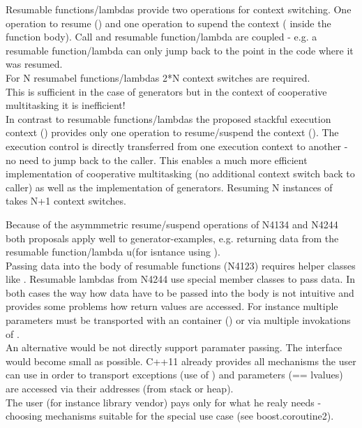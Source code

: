 Resumable functions/lambdas provide two operations for context switching. One
operation to resume (\rlop) and one operation to supend the context (\yield
inside the function body). Call and resumable function/lambda are coupled - e.g.
a resumable function/lambda can only jump back to the point in the code where it
was resumed.\\
For N resumabel functions/lambdas 2*N context switches are required.\\
This is sufficient in the case of generators but in the context of cooperative
multitasking it is inefficient!\\
In contrast to resumable functions/lambdas the proposed stackful execution
context (\ectx) provides only one operation to resume/suspend the context
(\ectxop). The execution control is directly transferred from one
execution context to another - no need to jump back to the caller. This enables
a much more efficient implementation of cooperative multitasking (no additional
context switch back to caller) as well as the implementation of generators.
Resuming N instances of \ectx takes N+1 context switches.

Because of the asymmmetric resume/suspend operations of N4134 and N4244 both
proposals apply well to generator-examples, e.g. returning data from the
resumable function/lambda u(for isntance using \yield).\\
Passing data into the body of resumable functions (N4123) requires helper
classes like \channel.
Resumable lambdas from N4244 use special member classes \rlwanted to pass data.
In both cases the way how data have to be passed into the body is not intuitive
and provides some problems how return values are accessed. For instance multiple
parameters must be transported with an container (\tuple) or via
multiple invokations of \rlwanted.\\
\newline
An alternative would be not directly support paramater passing. The interface
would become small as possible. C++11 already provides all mechanisms the user
can use in order to transport exceptions (use of \excpt) and parameters (==
lvalues) are accessed via their addresses (from stack or heap).\\
The user (for instance library vendor) pays only for what he realy needs -
choosing mechanisms suitable for the special use case (see
boost.coroutine2\cite{bcoroutine2}).

